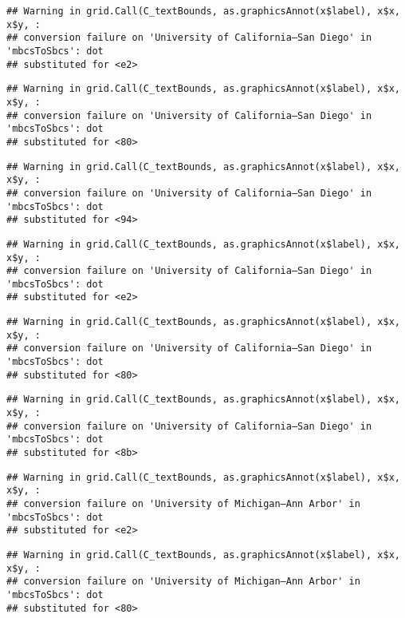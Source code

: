 \documentclass[]{article}
\begin{document}
\begin{verbatim}
## Warning in grid.Call(C_textBounds, as.graphicsAnnot(x$label), x$x, x$y, :
## conversion failure on 'University of California—​San Diego' in 'mbcsToSbcs': dot
## substituted for <e2>
\end{verbatim}

\begin{verbatim}
## Warning in grid.Call(C_textBounds, as.graphicsAnnot(x$label), x$x, x$y, :
## conversion failure on 'University of California—​San Diego' in 'mbcsToSbcs': dot
## substituted for <80>
\end{verbatim}

\begin{verbatim}
## Warning in grid.Call(C_textBounds, as.graphicsAnnot(x$label), x$x, x$y, :
## conversion failure on 'University of California—​San Diego' in 'mbcsToSbcs': dot
## substituted for <94>
\end{verbatim}

\begin{verbatim}
## Warning in grid.Call(C_textBounds, as.graphicsAnnot(x$label), x$x, x$y, :
## conversion failure on 'University of California—​San Diego' in 'mbcsToSbcs': dot
## substituted for <e2>
\end{verbatim}

\begin{verbatim}
## Warning in grid.Call(C_textBounds, as.graphicsAnnot(x$label), x$x, x$y, :
## conversion failure on 'University of California—​San Diego' in 'mbcsToSbcs': dot
## substituted for <80>
\end{verbatim}

\begin{verbatim}
## Warning in grid.Call(C_textBounds, as.graphicsAnnot(x$label), x$x, x$y, :
## conversion failure on 'University of California—​San Diego' in 'mbcsToSbcs': dot
## substituted for <8b>
\end{verbatim}

\begin{verbatim}
## Warning in grid.Call(C_textBounds, as.graphicsAnnot(x$label), x$x, x$y, :
## conversion failure on 'University of Michigan—​Ann Arbor' in 'mbcsToSbcs': dot
## substituted for <e2>
\end{verbatim}

\begin{verbatim}
## Warning in grid.Call(C_textBounds, as.graphicsAnnot(x$label), x$x, x$y, :
## conversion failure on 'University of Michigan—​Ann Arbor' in 'mbcsToSbcs': dot
## substituted for <80>
\end{verbatim}
\end{document}
